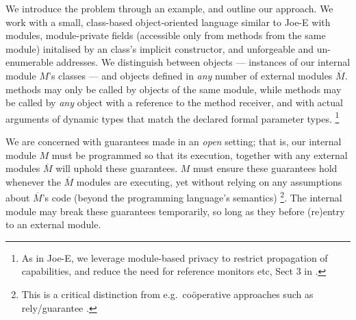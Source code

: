 \newcommand{\pwd}{key}

\renewcommand{\password}{key\xspace}

We introduce the problem  through an example, and outline our
approach.  We work with a  small, class-based object-oriented language similar to Joe-E \cite{JoeE} with modules,   module-private fields
({accessible} only from   methods {from} the same module)
initalised by an class's implicit constructor,
and unforgeable and un-enumerable addresses.
%
We distinguish between  \emph{\internalO}
objects --- instances of our internal module $M$'s classes ---
and \emph{\externalO} objects defined in
\emph{any} number of external modules $\overline M$. 
{ methods  {may only be} called by objects of the same
  module,  while   methods  may be called by \emph{any}
  object with a reference to the method receiver, {and with
  actual arguments of  dynamic types that match} the declared formal parameter types.} 
\footnote{As in Joe-E, we leverage  module-based privacy to restrict propagation of capabilities, and reduce the need for reference monitors etc, \cf Sect 3 in  \cite{JoeE}.}   

 \label{s:concepts}

We are concerned with guarantees made in an \emph{open} setting; that
is, our internal module
$M$ must be programmed so that 
its execution, together with any external modules $\overline M$
will uphold these guarantees.
$M$ must ensure these guarantees hold
whenever the
$\overline M$  \emph{\externalM} modules are executing,
yet without relying on any assumptions about $\overline M$'s code
(beyond the programming language's semantics)%
\footnote{
This is a critical distinction from e.g.\
co{\"o}perative approaches such as rely/guarantee
\cite{relyGuarantee-HayesJones-setss2017,relyGuarantee-vanStaden-mpc2015}.}.
The internal module may break these guarantees temporarily,
so long as they  before (re)entry to an external module.
 

 
